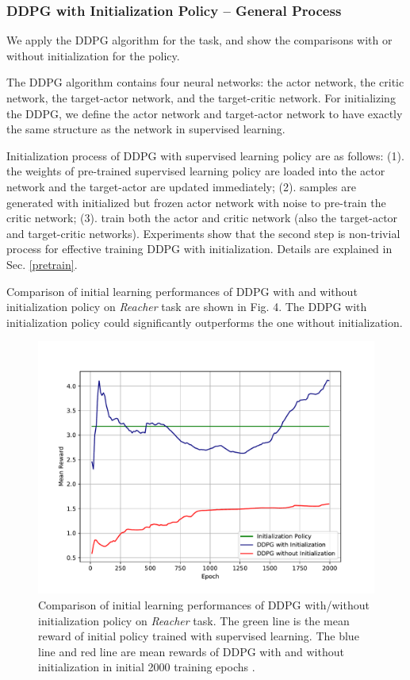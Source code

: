 \documentclass{article}
\begin{document}
\subsubsection{DDPG with Initialization Policy -- General Process}
We apply the DDPG algorithm for the task, and show the comparisons with or without initialization for the policy.

The DDPG algorithm contains four neural networks: the actor network, the critic network, the target-actor network, and the target-critic network. For initializing the DDPG, we define the actor network and target-actor network to have exactly the same structure as the network in supervised learning. 

Initialization process of DDPG with supervised learning policy are as follows: 
(1). the weights of pre-trained supervised learning policy are loaded into the actor network and the target-actor are updated immediately; (2). samples are generated with initialized but frozen actor network with noise to pre-train the critic network; (3). train both the actor and critic network (also the target-actor and target-critic networks). Experiments show that the second step is non-trivial process for effective training DDPG with initialization. Details are explained in Sec. \ref{pretrain}.

Comparison of initial learning performances of DDPG with and without initialization policy on \textit{Reacher} task are shown in Fig. 4. The DDPG with initialization policy could significantly outperforms the one without initialization. 

\begin{figure}[htbp]
	\centering
	\includegraphics[scale=0.8]{img/ddpg_compare1.pdf}
	\caption{Comparison of initial learning performances of DDPG with/without initialization policy on \textit{Reacher} task. The green line is the mean reward of initial policy trained with supervised learning. The blue line and red line are mean rewards of DDPG with and without initialization in initial 2000 training epochs . }
	\label{fig:universe}
\end{figure}
\end{document}
